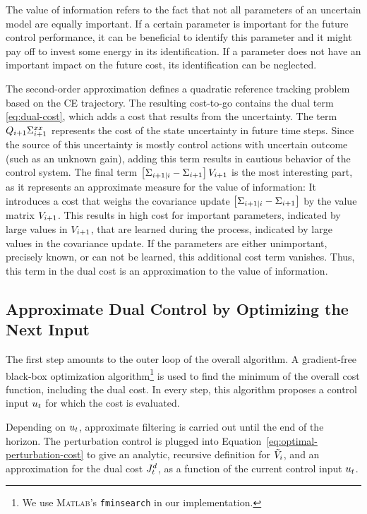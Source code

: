 The value of information refers to the fact that not all parameters of an
uncertain model are equally important. If a certain parameter is important for
the future control performance, it can be beneficial to identify this parameter
and it might pay off to invest some energy in its identification. If a
parameter does not have an important impact on the future cost, its
identification can be neglected.

The second-order approximation defines a quadratic reference
tracking problem based on the CE trajectory. The resulting cost-to-go contains
the dual term \eqref{eq:dual-cost}, which adds a cost that results from the
uncertainty. The term $Q_{i+1} \Sigma^{xx}_{i+1}$ represents the cost of the
state uncertainty in future time steps. Since the source of this uncertainty is
mostly control actions with uncertain outcome (such as an unknown gain),
adding this term results in cautious behavior of the control system. The final
term $\left[\Sigma_{i+1|i} - \Sigma_{i+1}\right] V_{i+1}$ is the most
interesting part, as it represents an approximate measure for the value of
information: It introduces a cost that weighs the covariance update
$\left[\Sigma_{i+1|i} - \Sigma_{i+1}\right]$ by the value matrix
$V_{i+1}$. This results in high cost for important parameters, indicated by
large values in $V_{i+1}$, that are learned during the process, indicated by
large values in the covariance update. If the parameters are either
unimportant, precisely known, or can not be learned, this additional cost term
vanishes. Thus, this term in the dual cost is an approximation to the value of
information.

\subsection{Approximate Dual Control by Optimizing the Next Input}
\label{sec:optim-curr-contr}

The first step  amounts to the outer loop of the overall algorithm. A
gradient-free black-box optimization algorithm\footnote{We use \textsc{Matlab}'s
\texttt{fminsearch} in our implementation.} is used to find the minimum of the
overall cost function, including the dual cost. In every step, this algorithm
proposes a control input $u_t$ for which the cost is evaluated.

Depending on $u_t$, approximate filtering is carried out until the end of the
horizon. The perturbation control is plugged into
Equation~\eqref{eq:optimal-perturbation-cost} to give an analytic, recursive
definition for $\tilde {V}_i$, and an approximation for the dual cost
$J_t^d$, as a function of the current control input $u_t$.

